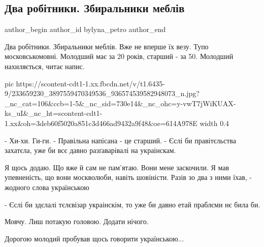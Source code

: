  
 
 
 
 
 
\subsection{Два робітники. Збиральники меблів}
\label{sec:22_08_2021.fb.bylyna_petro.1.nadpis_doroga_mova}
 
\ifcmt
 author_begin
   author_id bylyna_petro
 author_end
\fi

Два робітники. Збиральники меблів. Вже не вперше їх везу. Тупо московськомовні.
Молодший має за 20 років, старший - за 50.  Молодший нахиляється, читає напис.

\ifcmt
  pic https://scontent-cdt1-1.xx.fbcdn.net/v/t1.6435-9/233659230_3897559470349536_936574539582948073_n.jpg?_nc_cat=106&ccb=1-5&_nc_sid=730e14&_nc_ohc=y-vwT7jWiKUAX-ks_uI&_nc_ht=scontent-cdt1-1.xx&oh=3deb60f5020a851c3d466ad9432a9f48&oe=614A978E
  width 0.4
\fi

- Хи-хи. Ги-ги.  - Правільна напісана - це старший. - Єслі би правітєльства
захатєла, уже би всє давно разґаварівалі на украінскам.

Я щось додаю. Що вже й сам не пам'ятаю. Вони мене заскочили. Я мав упевненість,
що вони москволюби, навіть шовіністи. Разів зо два з ними їхав, - жодного слова
українською

- Єслі би здєлалі тєлєвізар украінскім, то уже би давно етай праблєми нє била
би.

Мовчу. Лиш потакую головою. Додати нічого.

Дорогою молодий пробував щось говорити українською...
